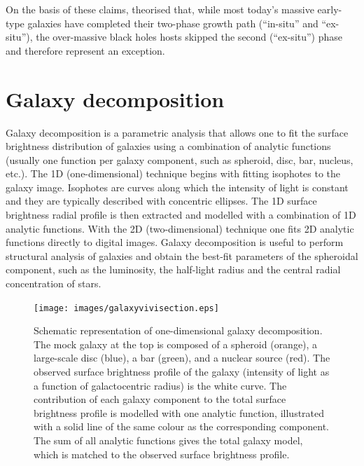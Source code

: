 On the basis of these claims, \cite{ferremateu2015} theorised that, 
while most today's massive early-type galaxies have completed their two-phase growth path (``in-situ'' and ``ex-situ''), 
the over-massive black holes hosts skipped the second (``ex-situ'') phase and therefore represent an exception. 


\section{Galaxy decomposition}
Galaxy decomposition is a parametric analysis that allows one to fit the surface brightness distribution
of galaxies using a combination of analytic functions (usually one function per
galaxy component, such as spheroid, disc, bar, nucleus, etc.). 
The 1D (one-dimensional) technique begins with fitting isophotes to the galaxy image.
Isophotes are curves along which the intensity of light is constant 
and they are typically described with concentric ellipses.  
The 1D surface brightness radial profile is then extracted and modelled with a combination of 1D analytic functions. 
With the 2D (two-dimensional) technique one fits 2D analytic functions directly to digital images. 
Galaxy decomposition is useful to perform structural analysis of galaxies and obtain the best-fit 
parameters of the spheroidal component, such as the luminosity, the half-light radius 
and the central radial concentration of stars. \\

\begin{figure}[htb]
\begin{center}
\texttt{[image: images/galaxyvivisection.eps]}
\end{center}
\caption{Schematic representation of one-dimensional galaxy decomposition. 
The mock galaxy at the top is composed of a spheroid (orange), a large-scale disc (blue), 
a bar (green), and a nuclear source (red). 
The observed surface brightness profile of the galaxy (intensity of light as a function of galactocentric radius) 
is the white curve. 
The contribution of each galaxy component to the total surface brightness profile is modelled with one analytic function, 
illustrated with a solid line of the same colour as the corresponding component. 
The sum of all analytic functions gives the total galaxy model, 
which is matched to the observed surface brightness profile. }
\end{figure}

